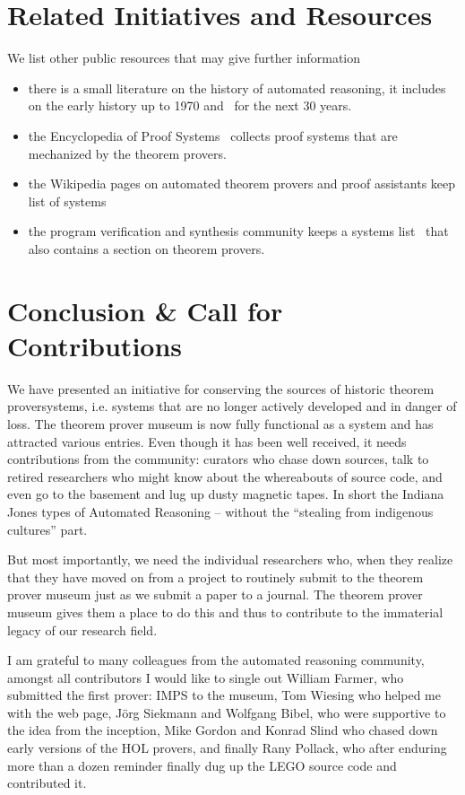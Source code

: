 \documentclass[smallcondensed]{svjour3}
\begin{document}
\section{Related Initiatives and Resources}
We list other public resources that may give further information
\begin{itemize}
\item there is a small literature on the history of automated reasoning, it
  includes~\cite{Bibel:ehpad07} on the early history up to 1970 and~\cite{RobVor:hoar01}
  for the next 30 years. 
\item the Encyclopedia of Proof Systems~\cite{Wolzenlogel-Paleo:teps17} collects proof
  systems that are mechanized by the theorem provers.
\item the Wikipedia pages on automated theorem provers and proof assistants keep list of systems
\item the program verification and synthesis community keeps a systems
  list~\cite{vsstp:on} that also contains a section on theorem provers.
\end{itemize}

\section{Conclusion \& Call for Contributions}\label{sec:concl}

We have presented an initiative for conserving the sources of historic theorem proversystems, i.e. systems that are no longer actively developed and in danger of loss. The
theorem prover museum is now fully functional as a system and has attracted various
entries. Even though it has been well received, it needs contributions from the community:
curators who chase down sources, talk to retired researchers who might know about the
whereabouts of source code, and even go to the basement and lug up dusty magnetic
tapes. In short the Indiana Jones types of Automated Reasoning -- without the ``stealing
from indigenous cultures'' part.

But most importantly, we need the individual researchers who, when they realize that they
have moved on from a project to routinely submit to the theorem prover museum just as we
submit a paper to a journal. The theorem prover museum gives them a place to do this and
thus to contribute to the immaterial legacy of our research field. 

\begin{acknowledgements}
  I am grateful to many colleagues from the automated reasoning community, amongst all
  contributors I would like to single out William Farmer, who submitted the first prover:
  IMPS to the museum, Tom Wiesing who helped me with the web page, J\"org Siekmann and
  Wolfgang Bibel, who were supportive to the idea from the inception, Mike Gordon and
  Konrad Slind who chased down early versions of the HOL provers, and finally Rany
  Pollack, who after enduring more than a dozen reminder finally dug up the LEGO source
  code and contributed it.
\end{acknowledgements}

\printbibliography
\end{document}
